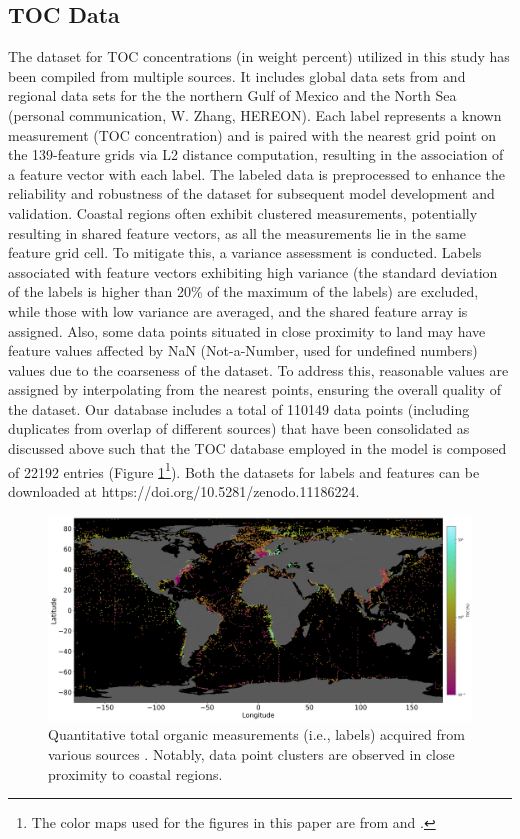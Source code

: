 \documentclass[journal abbreviation, manuscript]{copernicus}
\begin{document}
\subsection{TOC Data}
\label{subsec: labels}
The dataset for TOC concentrations (in weight percent) utilized in this study has been compiled from multiple sources. It includes global data sets from \cite{SEITER20042001, romankevich2009organic, mosaic} and regional data sets for the the northern Gulf of Mexico \citep{beazley2003significance} and the North Sea (personal communication, W. Zhang, HEREON). Each label represents a known measurement (TOC concentration) and is paired with the nearest grid point on the 139-feature grids via L2 distance computation, resulting in the association of a feature vector with each label. The labeled data is preprocessed to enhance the reliability and robustness of the dataset for subsequent model development and validation. Coastal regions often exhibit  clustered measurements, potentially resulting in shared feature vectors, as all the measurements lie in the same feature grid cell. To mitigate this, a variance assessment is conducted. Labels associated with feature vectors exhibiting high variance (the standard deviation of the labels is higher than 20\% of the maximum of the labels)  are excluded, while those with low variance are averaged, and the shared feature array is assigned. Also, some data points situated in close proximity to land may have feature values affected by NaN (Not-a-Number, used for undefined numbers) values due to the coarseness of the dataset. To address this, reasonable values are assigned by interpolating from the nearest points, ensuring the overall quality of the dataset. Our database includes a total of 110149 data points (including duplicates from overlap of different sources) that have been consolidated as discussed above such that the TOC database employed in the model is composed of 22192 entries (Figure \ref{fig:toclabels}\footnote{The color maps used for the figures in this paper are from \cite{fabiocramericolormap} and \cite{cmoceancolormap}.}). Both the datasets for labels and features can be downloaded at https://doi.org/10.5281/zenodo.11186224.

\begin{figure}[!htb]
    \includegraphics[width=12cm]{figures/f01.png}
    \caption{Quantitative total organic measurements (i.e., labels) acquired from various sources \citep{SEITER20042001, romankevich2009organic, mosaic, beazley2003significance}. Notably, data point clusters are observed in close proximity to coastal regions.}
    \label{fig:toclabels}
\end{figure}
\end{document}
